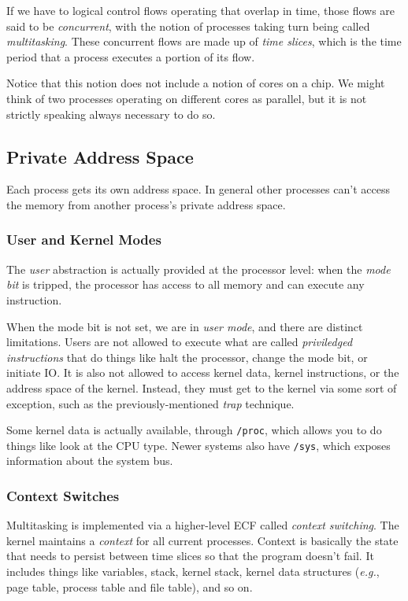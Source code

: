 \documentclass[fleqn]{article}
\begin{document}
If we have to logical control flows operating that overlap in time, those flows are said to be \textit{concurrent}, with the notion of processes taking turn being called \textit{multitasking}. These concurrent flows are made up of \textit{time slices}, which is the time period that a process executes a portion of its flow.

Notice that this notion does not include a notion of cores on a chip. We might think of two processes operating on different cores as parallel, but it is not strictly speaking always necessary to do so.

\subsection{Private Address Space}

Each process gets its own address space. In general other processes can't access the memory from another process's private address space.

\subsubsection{User and Kernel Modes}

The \textit{user} abstraction is actually provided at the processor level: when the \textit{mode bit} is tripped, the processor has access to all memory and can execute any instruction.

When the mode bit is not set, we are in \textit{user mode}, and there are distinct limitations. Users are not allowed to execute what are called \textit{priviledged instructions} that do things like halt the processor, change the mode bit, or initiate IO. It is also not allowed to access kernel data, kernel instructions, or the address space of the kernel. Instead, they must get to the kernel via some sort of exception, such as the previously-mentioned \textit{trap} technique.

Some kernel data is actually available, through \texttt{/proc}, which allows you to do things like look at the CPU type. Newer systems also have \texttt{/sys}, which exposes information about the system bus.

\subsubsection{Context Switches}

Multitasking is implemented via a higher-level ECF called \textit{context switching}. The kernel maintains a \textit{context} for all current processes. Context is basically the state that needs to persist between time slices so that the program doesn't fail. It includes things like variables, stack, kernel stack, kernel data structures (\textit{e.g.}, page table, process table and file table), and so on.
\end{document}
